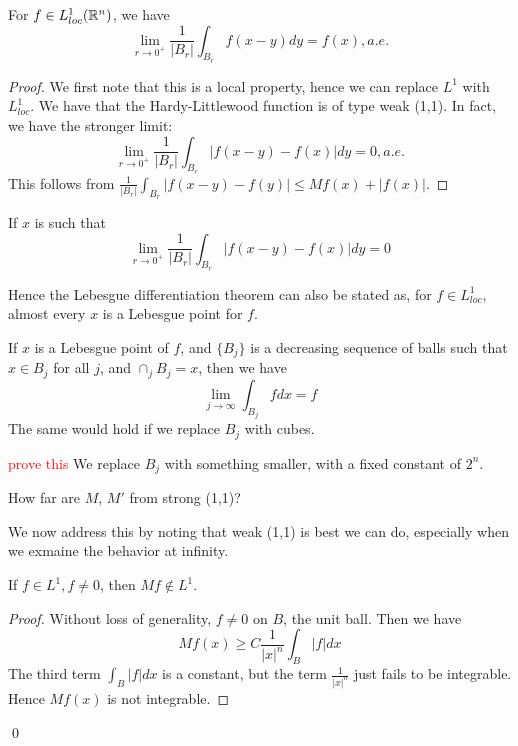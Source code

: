 \begin{corollary}
    For $f\in L_{loc}^1(\mathbb{R}^n)$, we have
    \begin{equation*}
        \lim_{r\to 0^+}\frac{1}{|B_r|}\int_{B_r}f(x-y)dy=f(x), a.e.
    \end{equation*}
\end{corollary}
\begin{proof}
    We first note that this is a local property, hence we can replace $L^1$ with $L_{loc}^1$. We have that the Hardy-Littlewood function is of type weak (1,1). In fact, we have the stronger limit:
    \begin{equation*}
        \lim_{r\to 0^+}\frac{1}{|B_r|}\int_{B_r}|f(x-y)-f(x)|dy=0, a.e.
    \end{equation*}
    This follows from $\frac{1}{|B_r|}\int_{B_r}|f(x-y)-f(y)|\leq Mf(x)+|f(x)|$.  
\end{proof}

\begin{definition}
    If $x$ is such that 
    \begin{equation*}
        \lim_{r\to 0^+}\frac{1}{|B_r|}\int_{B_r}|f(x-y)-f(x)|dy=0
    \end{equation*}
\end{definition}
\begin{note}
    Hence the Lebesgue differentiation theorem can also be stated as, for $f\in L_{loc}^1$, almost every $x$ is a Lebesgue point for $f$.
\end{note}
\begin{proposition}
    If $x$ is a Lebesgue point of $f$, and $\{B_j\}$ is a decreasing sequence of balls such that $x\in B_j$ for all $j$, and $\cap_jB_j=x$, then we have
    \begin{equation*}
        \lim_{j\to\infty}\int_{B_j}fdx=f
    \end{equation*}
    The same would hold if we replace $B_j$ with cubes.
\end{proposition}
\begin{remark}
    \textcolor{red}{prove this} We replace $B_j$ with something smaller, with a fixed constant of $2^n$.
\end{remark}

\begin{problem}
    How far are $M$, $M'$ from strong (1,1)?
\end{problem}
We now address this by noting that weak (1,1) is best we can do, especially when we exmaine the behavior at infinity.
\begin{proposition}
    If $f\in L^1, f\neq 0$, then $Mf\not\in L^1$.
\end{proposition}
\begin{proof}
    Without loss of generality, $f\neq 0$ on $B$, the unit ball. Then we have
    \begin{equation*}
        Mf(x)\geq C\frac{1}{|x|^n}\int_{B}|f|dx
    \end{equation*}
    The third term $\int_B|f|dx$ is a constant, but the term $\frac{1}{|x|^n}$ just fails to be integrable. Hence $Mf(x)$ is not integrable.
\end{proof}
\qed

